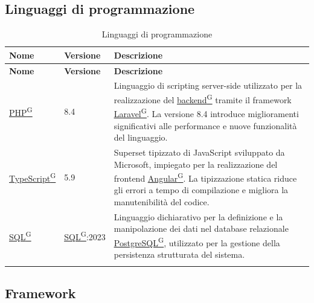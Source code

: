 \documentclass[a4paper,12pt]{article}
\providecommand{\glslink}[2]{\href{https://alittlebyte-19.github.io/Documentazione/glossario.html\#gls-#1}{\underline{#2}\textsuperscript{\scriptsize G}}}
\begin{document}
\subsection{Linguaggi di programmazione}

\renewcommand{\arraystretch}{1.3}
{\small
\setlength{\LTleft}{0pt}
\setlength{\LTright}{0pt}
\begin{longtable}{|p{3cm}|p{1.8cm}|p{9.7cm}|}
    \hline
    \rowcolor{gray!20}
    \textbf{Nome} & \textbf{Versione} & \textbf{Descrizione} \\
    \hline
    \endfirsthead
    \hline
    \rowcolor{gray!20}
    \textbf{Nome} & \textbf{Versione} & \textbf{Descrizione} \\
    \hline
    \endhead
    \glslink{php}{PHP} & 8.4 & Linguaggio di scripting server-side utilizzato per la realizzazione del \glslink{backend}{backend} tramite il framework \glslink{laravel}{Laravel}. La versione 8.4 introduce miglioramenti significativi alle performance e nuove funzionalità del linguaggio. \\
    \hline
    \glslink{typescript}{TypeScript} & 5.9 & Superset tipizzato di JavaScript sviluppato da Microsoft, impiegato per la realizzazione del frontend \glslink{angular}{Angular}. La tipizzazione statica riduce gli errori a tempo di compilazione e migliora la manutenibilità del codice. \\
    \hline
    \glslink{sql-structured-query-language}{SQL} & \glslink{sql-structured-query-language}{SQL}:2023 & Linguaggio dichiarativo per la definizione e la manipolazione dei dati nel database relazionale \glslink{postgresql}{PostgreSQL}, utilizzato per la gestione della persistenza strutturata del sistema. \\
    \hline
    \caption{Linguaggi di programmazione}
\end{longtable}
}

\subsection{Framework}
\end{document}
